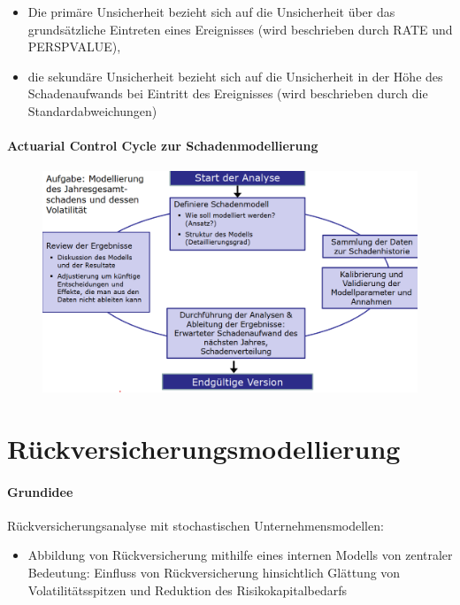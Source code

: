 \documentclass[12pt]{report}
\theoremstyle{dotless}
\theoremstyle{definition}
\begin{document}
\begin{itemize}
\item Die primäre Unsicherheit bezieht sich auf die Unsicherheit über das grundsätzliche Eintreten eines Ereignisses (wird beschrieben durch RATE und PERSPVALUE),
\item die sekundäre Unsicherheit bezieht sich auf die Unsicherheit in der Höhe des
Schadenaufwands bei Eintritt des Ereignisses (wird beschrieben durch die Standardabweichungen)
\end{itemize}




\subsubsection{Actuarial Control Cycle zur Schadenmodellierung}

\begin{figure}[ht]
	\centering
	\includegraphics[width= \textwidth]{Bilder/ControlCycle.png}
\end{figure}


\chapter{Rückversicherungsmodellierung}

\subsubsection{Grundidee}

Rückversicherungsanalyse mit stochastischen Unternehmensmodellen:
\begin{itemize}
\item Abbildung von Rückversicherung mithilfe eines internen Modells von zentraler Bedeutung: Einfluss von Rückversicherung hinsichtlich Glättung von Volatilitätsspitzen und Reduktion des Risikokapitalbedarfs
\end{itemize}
\end{document}
